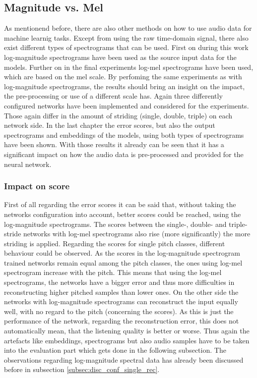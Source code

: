 \subsection{Magnitude vs. Mel}
As mentionend before, there are also other methods on how to use audio data for machine learnig tasks. Except from using the raw time-domain signal, there also exist different types of spectrograms that can be used. First on during this work log-magnitude spectrograms have been used as the source input data for the models. Further on in the final experiments log-mel spectrograms have been used, which are based on the mel scale. By perfoming the same experiments as with log-magnitude spectrograms, the results should bring an insight on the impact, the pre-processing or use of a different scale has. Again three differently configured networks have been implemented and considered for the experiments. Those again differ in the amount of striding (single, double, triple) on each network side. In the last chapter the error scores, but also the output spectrograms and embeddings of the models, using both types of spectrograms have been shown. With those results it already can be seen that it has a significant impact on how the audio data is pre-processed and provided for the neural network. 

\subsubsection{Impact on score}
First of all regarding the error scores it can be said that, without taking the networks configuration into account, better scores could be reached, using the log-magnitude spectrograms. The scores between the single-, double- and triple-stride networks with log-mel spectrograms also rise (more significantly) the more striding is applied. Regarding the scores for single pitch classes, different behaviour could be observed. As the scores in the log-magnitude spectrogram trained networks remain equal among the pitch classes, the ones using log-mel spectrogram increase with the pitch. This means that using the log-mel spectrograms, the networks have a bigger error and thus more difficulties in reconstructing higher pitched samples than lower ones. On the other side the networks with log-magnitude spectrograms can reconstruct the input equally well, with no regard to the pitch (concerning the scores). As this is just the performance of the network, regarding the reconstruction error, this does not automatically mean, that the listening quality is better or worse. Thus again the artefacts like embeddings, spectrograms but also audio samples have to be taken into the evaluation part which gets done in the following subsection. The observations regarding log-magnitude spectral data has already been discussed before in subsection \ref{subsec:disc_conf_single_rec}.

